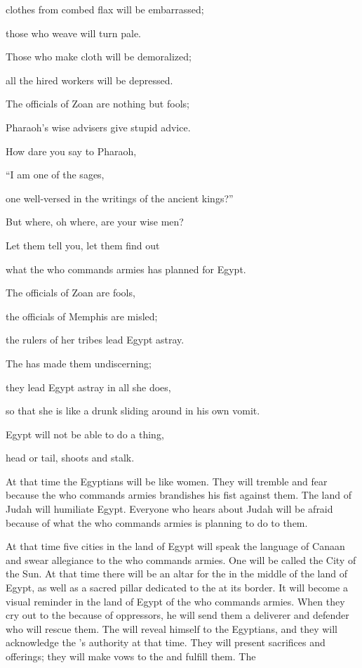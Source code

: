 {clothes from combed
flax
will be embarrassed;
\par }{\Q those who weave
will turn pale.
\par }{\Q {}Those who make cloth
will be
demoralized;
\par }{\Q all
the hired
workers
will be depressed.
\par }{\Q {}The officials
of Zoan
are nothing but
fools;
\par }{\Q Pharaoh’s
wise
advisers
give stupid
advice.
\par }{\Q How
dare you say
to
Pharaoh,
\par }{\Q “I
am one
of the sages,
\par }{\Q one well-versed in the writings of the ancient
kings?”
\par }{\Q {}But where,
oh
where, are your wise
men?

\par }{\Q Let them tell
you, let
them find
out
\par }{\Q what
the
{}
who commands armies
has planned
for Egypt.
\par }{\Q {}The officials
of Zoan
are fools,
\par }{\Q the officials
of Memphis
are misled;
\par }{\Q the rulers of her
tribes
lead Egypt
astray.
\par }{\Q {}The
{}
has made them undiscerning;
\par }{\Q they lead Egypt
astray
in all
she does,
\par }{\Q so that she is like a drunk
sliding around
in his own vomit.
\par }{\Q {}Egypt
will not
be
able
to do
a thing,
\par }{\Q head
or tail,
shoots
and stalk.
\par }{\PP {}At that
time
the Egyptians
will be like
women.
They will tremble
and fear
because the
{}
who commands armies
brandishes
his fist
against them.
The land
of Judah
will humiliate
Egypt.
Everyone
who
hears
about Judah will be
afraid
because of what the
{}
who commands armies
is
planning
to do to them.
\par }{\PP {}At that
time
five
cities
in the land
of Egypt
will speak
the language
of Canaan
and swear
allegiance to the
{}
who commands armies.
One
will be called
the City
of the Sun.
At that time
there will be
an altar
for the
{}
in the middle
of the land
of Egypt,
as well as a sacred pillar
dedicated
to the
{}
at its border.
It will become
a visual
reminder
in the land
of Egypt
of the
{}
who commands armies.
When
they cry out
to
the {}
because
of oppressors,
he will send
them a deliverer
and defender
who will rescue them.
The
{}
will reveal
himself to the Egyptians,
and they will acknowledge
the
{}’s
authority
at that time.
They will present
sacrifices
and offerings;
they
will make
vows
to the
{}
and fulfill them.
The

}
